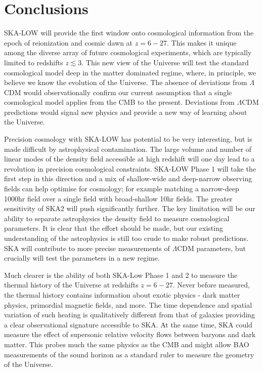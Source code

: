 \documentclass{PoS}
\begin{document}
\section{Conclusions}

SKA-LOW will provide the first window onto cosmological information from the epoch of reionization and cosmic dawn at $z=6-27$. This makes it unique among the diverse array of future cosmological experiments, which are typically limited to redshifts $z\lesssim3$. This new view of the Universe will test the standard cosmological model deep in the matter dominated regime, where, in principle, we believe we know the evolution of the Universe. The absence of deviations from $\Lambda$CDM would observationally confirm our current assumption that a single cosmological model applies from the CMB to the present. Deviations from $\Lambda$CDM predictions would signal new physics and provide a new way of learning about the Universe.

Precision cosmology with SKA-LOW has potential to be very interesting, but is made difficult by astrophysical contamination. The large volume and number of linear modes of the density field accessible at high redshift will one day lead to a revolution in precision cosmological constraints. SKA-LOW Phase 1 will take the first step in this direction and a mix of shallow-wide and deep-narrow observing fields can help optimise for cosmology; for example matching a narrow-deep 1000hr field over a single field with broad-shallow 10hr fields. The greater sensitivity of SKA2 will push significantly further. The key limitation will be our ability to separate astrophysics the density field to measure cosmological parameters. It is clear that the effort should be made, but our existing understanding of the astrophysics is still too crude to make robust predictions. SKA will contribute to more precise measurements of $\Lambda$CDM parameters, but crucially will test the parameters in a new regime.

Much clearer is the ability of both SKA-Low Phase 1 and 2 to measure the thermal history of the Universe at redshifts $z=6-27$. Never before measured, the thermal history contains information about exotic physics - dark matter physics, primordial magnetic fields, and more. The time dependence and spatial variation of such heating is qualitatively different from that of galaxies providing a clear observational signature accessible to SKA. At the same time, SKA could measure the effect of supersonic relative velocity flows between baryons and dark matter. This probes much the same physics as the CMB and might allow BAO measurements of the sound horizon as a standard ruler to measure the geometry of the Universe.
\end{document}
